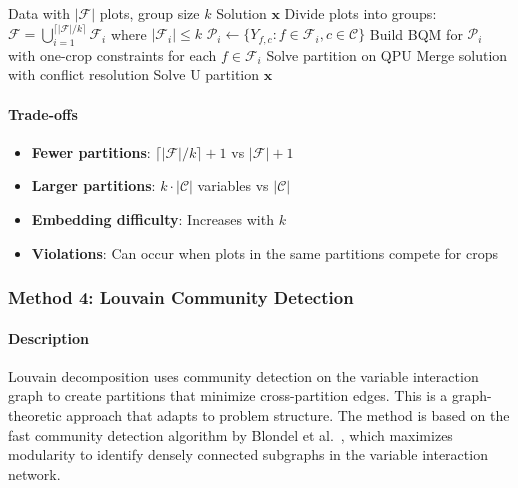 \documentclass{oqireport}
\begin{document}
\begin{algorithm}
\caption{Multilevel Partitioning ($k$-plot groups)}
\begin{algorithmic}[1]
\Require Data with $|\mathcal{F}|$ plots, group size $k$
\Ensure Solution $\mathbf{x}$
\State Divide plots into groups: $\mathcal{F} = \bigcup_{i=1}^{\lceil |\mathcal{F}|/k \rceil} \mathcal{F}_i$ where $|\mathcal{F}_i| \leq k$
    \State $\mathcal{P}_i \leftarrow \{Y_{f,c} : f \in \mathcal{F}_i, c \in \mathcal{C}\}$
    \State Build BQM for $\mathcal{P}_i$ with one-crop constraints for each $f \in \mathcal{F}_i$
    \State Solve partition on QPU
    \State Merge solution with conflict resolution
\EndFor
\State Solve U partition
\State \Return $\mathbf{x}$
\end{algorithmic}
\end{algorithm}

\paragraph{Trade-offs}
\begin{itemize}
\item \textbf{Fewer partitions}: $\lceil |\mathcal{F}|/k \rceil + 1$ vs $|\mathcal{F}| + 1$
\item \textbf{Larger partitions}: $k \cdot |\mathcal{C}|$ variables vs $|\mathcal{C}|$
\item \textbf{Embedding difficulty}: Increases with $k$
\item \textbf{Violations}: Can occur when plots in the same partitions compete for crops
\end{itemize}

\subsubsection{Method 4: Louvain Community Detection}

\paragraph{Description}
Louvain decomposition uses community detection on the variable interaction graph to create partitions that minimize cross-partition edges. This is a graph-theoretic approach that adapts to problem structure. The method is based on the fast community detection algorithm by Blondel et al.~\cite{blondel2008fast}, which maximizes modularity to identify densely connected subgraphs in the variable interaction network.
\end{document}
